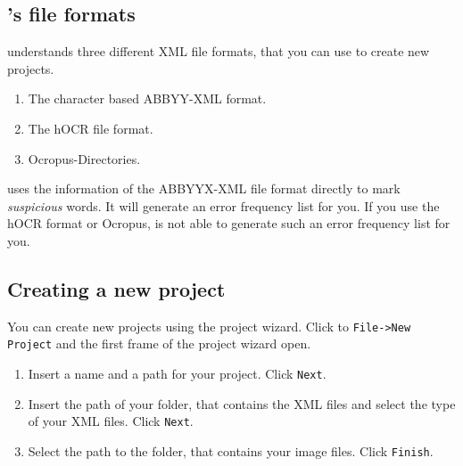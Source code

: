 \subsection{\pocoto{}'s file formats}
\begin{frame}
	\pocoto{} understands three different XML file formats, that you can use
	to create new projects.
	\begin{enumerate}
		\item The character based ABBYY-XML format.
		\item The hOCR file format.
		\item Ocropus-Directories.
	\end{enumerate}
	\pocoto{} uses the information of the ABBYYX-XML file format directly to mark
	\emph{suspicious} words. It will generate an error frequency list for you. If
	you use the hOCR format or Ocropus, \pocoto{} is not able to generate such an
	error frequency list for you.
\end{frame}

\subsection{Creating a new project}
\begin{frame}

	You can create new projects using the project wizard. Click to
	\texttt{File->New Project} and the first frame of the project wizard
	open.
	\begin{enumerate}
		\item Insert a name and a path for your project. Click \texttt{Next}.
		\item Insert the path of your folder, that contains the XML files and
			select the type of your XML files. Click \texttt{Next}.
		\item Select the path to the folder, that contains your image
			files. Click \texttt{Finish}.
	\end{enumerate}
\end{frame}

